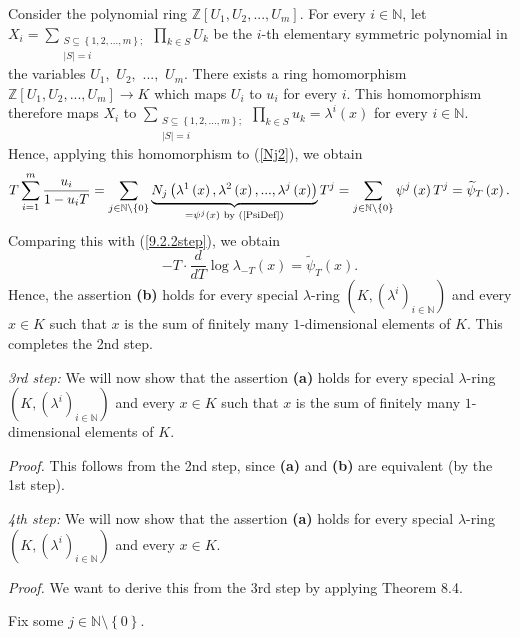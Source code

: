 \documentclass[numbers=enddot,12pt,final,onecolumn,notitlepage]{scrartcl}%
\begin{document}
Consider the polynomial ring $\mathbb{Z}\left[  U_{1},U_{2},...,U_{m}\right]
$. For every $i\in\mathbb{N}$, let $X_{i}=\sum\limits_{\substack{S\subseteq
\left\{  1,2,...,m\right\}  ;\\\left\vert S\right\vert =i}}\prod\limits_{k\in
S}U_{k}$ be the $i$-th elementary symmetric polynomial in the variables
$U_{1},$ $U_{2},$ $...,$ $U_{m}$. There exists a ring homomorphism
$\mathbb{Z}\left[  U_{1},U_{2},...,U_{m}\right]  \rightarrow K$ which maps
$U_{i}$ to $u_{i}$ for every $i$. This homomorphism therefore maps $X_{i}$ to
$\sum\limits_{\substack{S\subseteq\left\{  1,2,...,m\right\}  ;\\\left\vert
S\right\vert =i}}\prod\limits_{k\in S}u_{k}=\lambda^{i}\left(  x\right)  $ for
every $i\in\mathbb{N}$. Hence, applying this homomorphism to (\ref{Nj2}), we
obtain%
\[
T\sum_{i=1}^{m}\dfrac{u_{i}}{1-u_{i}T}=\sum_{j\in\mathbb{N}\setminus\left\{
0\right\}  }\underbrace{N_{j}\left(  \lambda^{1}\left(  x\right)  ,\lambda
^{2}\left(  x\right)  ,...,\lambda^{j}\left(  x\right)  \right)  }_{=\psi
^{j}\left(  x\right)  \text{ by (\ref{PsiDef})}}T^{j}=\sum_{j\in
\mathbb{N}\setminus\left\{  0\right\}  }\psi^{j}\left(  x\right)
T^{j}=\widetilde{\psi}_{T}\left(  x\right)  .
\]
Comparing this with (\ref{9.2.2step}), we obtain%
\[
-T\cdot\dfrac{d}{dT}\log\lambda_{-T}\left(  x\right)  =\widetilde{\psi}%
_{T}\left(  x\right)  .
\]
Hence, the assertion \textbf{(b)} holds for every special $\lambda$-ring
$\left(  K,\left(  \lambda^{i}\right)  _{i\in\mathbb{N}}\right)  $ and every
$x\in K$ such that $x$ is the sum of finitely many $1$-dimensional elements of
$K$. This completes the 2nd step.

\textit{3rd step:} We will now show that the assertion \textbf{(a)} holds for
every special $\lambda$-ring $\left(  K,\left(  \lambda^{i}\right)
_{i\in\mathbb{N}}\right)  $ and every $x\in K$ such that $x$ is the sum of
finitely many $1$-dimensional elements of $K$.

\textit{Proof.} This follows from the 2nd step, since \textbf{(a)} and
\textbf{(b)} are equivalent (by the 1st step).

\textit{4th step:} We will now show that the assertion \textbf{(a)} holds for
every special $\lambda$-ring $\left(  K,\left(  \lambda^{i}\right)
_{i\in\mathbb{N}}\right)  $ and every $x\in K$.

\textit{Proof.} We want to derive this from the 3rd step by applying Theorem 8.4.

Fix some $j\in\mathbb{N}\setminus\left\{  0\right\}  $.
\end{document}
